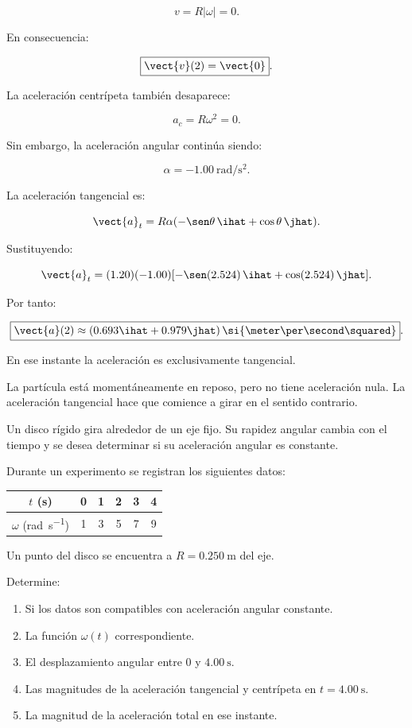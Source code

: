 \begin{explicacion}
\[
v=R|\omega|=0.
\]

En consecuencia:

\[
\boxed{\vect{v}(2)=\vect{0}}.
\]

La aceleración centrípeta también desaparece:

\[
a_c=R\omega^2=0.
\]

Sin embargo, la aceleración angular continúa siendo:

\[
\alpha=-\SI{1.00}{\radian\per\second\squared}.
\]

La aceleración tangencial es:

\[
\vect{a}_t
=
R\alpha
(-\sen\theta\,\ihat+\cos\theta\,\jhat).
\]

Sustituyendo:

\[
\vect{a}_t
=
(1.20)(-1.00)
[-\sen(2.524)\,\ihat+\cos(2.524)\,\jhat].
\]

Por tanto:

\[
\boxed{
\vect{a}(2)
\approx(0.693\ihat+0.979\jhat)\,
\si{\meter\per\second\squared}
}.
\]

En ese instante la aceleración es exclusivamente tangencial.

La partícula está momentáneamente en reposo, pero no tiene
aceleración nula. La aceleración tangencial hace que comience
a girar en el sentido contrario.
\end{explicacion}


\begin{ejercicio}
Un disco rígido gira alrededor de un eje fijo. Su rapidez
angular cambia con el tiempo y se desea determinar si su
aceleración angular es constante.

Durante un experimento se registran los siguientes datos:

\begin{center}
\begin{tabular}{c|ccccc}
\hline
\(t\) (\si{\second}) & 0 & 1 & 2 & 3 & 4 \\
\hline
\(\omega\) (\si{\radian\per\second}) & 1 & 3 & 5 & 7 & 9 \\
\hline
\end{tabular}
\end{center}

Un punto del disco se encuentra a
\(R=\SI{0.250}{\meter}\) del eje.

Determine:

\begin{enumerate}[label=\alph*)]
    \item Si los datos son compatibles con aceleración angular constante.
    \item La función \(\omega(t)\) correspondiente.
    \item El desplazamiento angular entre \(0\) y
    \(\SI{4.00}{\second}\).
    \item Las magnitudes de la aceleración tangencial y centrípeta
    en \(t=\SI{4.00}{\second}\).
    \item La magnitud de la aceleración total en ese instante.
\end{enumerate}
\end{ejercicio}

